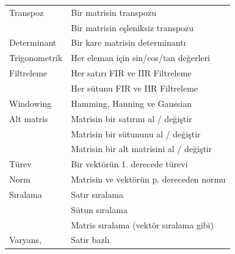\begin{longtable}{p{80pt} p{250pt}}
 Transpoz								&	Bir matrisin transpozu																			\\%
 											  &	Bir matrisin eşleniksiz transpozu														\\%
 Determinant						& Bir kare matrisin determinantı															\\%
 Trigonometrik					& Her eleman için sin/cos/tan değerleri 											\\%
 Filtreleme							& Her satırı FIR ve IIR Filtreleme 														\\%
 												& Her sütunu FIR ve IIR Filtreleme 														\\%
 Windowing 							& Hamming, Hanning ve Gaussian 																\\%
 Alt matris 						& Matrisin bir satırını al / değiştir   											\\%
 												& Matrisin bir sütununu al / değiştir													\\%
 												& Matrisin bir alt matrisini al / değiştir										\\%
 Türev									& Bir vektörün 1. derecede türevi															\\%
 Norm 									& Matrisin ve vektörün p. dereceden normu 										\\%
 Sıralama 							& Satır sıralama 																							\\%
 												& Sütun sıralama 																							\\%
 												& Matris sıralama (vektör sıralama gibi) 											\\%
 Varyans,								& Satır bazlı 	 																							\\%

\end{longtable}
